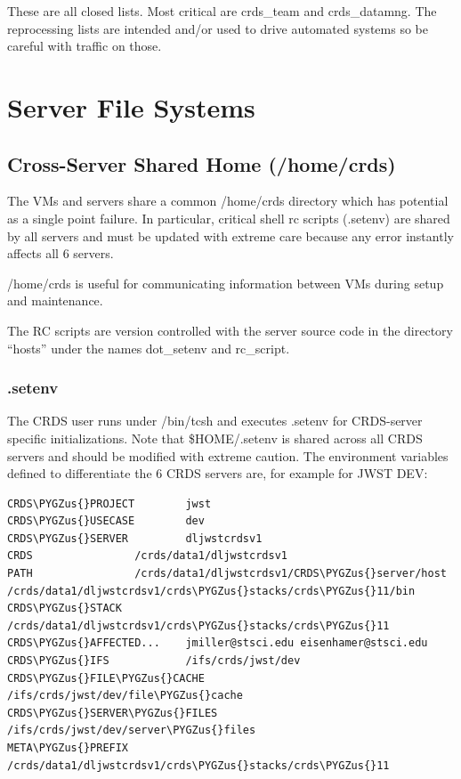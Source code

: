 \documentclass[letterpaper,10pt,english]{sphinxmanual}
\def\PYGZus{\char`\_}
\begin{document}
These are all closed lists.  Most critical are crds\_team and crds\_datamng.   The reprocessing lists are intended and/or used to drive
automated systems so be careful with traffic on those.


\chapter{Server File Systems}
\label{server_guide:server-file-systems}

\section{Cross-Server Shared Home (/home/crds)}
\label{server_guide:cross-server-shared-home-home-crds}
The VMs and servers share a common /home/crds directory which has potential as a single point failure.  In particular,
critical shell rc scripts (.setenv) are shared by all servers and must be updated with extreme care because
any error instantly affects all 6 servers.

/home/crds is useful for communicating information between VMs during setup and maintenance.

The RC scripts are version controlled with the server source code in the directory ``hosts'' under the names dot\_setenv
and rc\_script.


\subsection{.setenv}
\label{server_guide:setenv}
The CRDS user runs under /bin/tcsh and executes .setenv for CRDS-server specific initializations.   Note that
\$HOME/.setenv is shared across all CRDS servers and should be modified with extreme caution.   The environment
variables defined to differentiate the 6 CRDS servers are,  for example for JWST DEV:

\begin{Verbatim}[commandchars=\\\{\}]
CRDS\PYGZus{}PROJECT        jwst
CRDS\PYGZus{}USECASE        dev
CRDS\PYGZus{}SERVER         dljwstcrdsv1
CRDS                /crds/data1/dljwstcrdsv1
PATH                /crds/data1/dljwstcrdsv1/CRDS\PYGZus{}server/host   /crds/data1/dljwstcrdsv1/crds\PYGZus{}stacks/crds\PYGZus{}11/bin
CRDS\PYGZus{}STACK          /crds/data1/dljwstcrdsv1/crds\PYGZus{}stacks/crds\PYGZus{}11
CRDS\PYGZus{}AFFECTED...    jmiller@stsci.edu eisenhamer@stsci.edu
CRDS\PYGZus{}IFS            /ifs/crds/jwst/dev
CRDS\PYGZus{}FILE\PYGZus{}CACHE     /ifs/crds/jwst/dev/file\PYGZus{}cache
CRDS\PYGZus{}SERVER\PYGZus{}FILES   /ifs/crds/jwst/dev/server\PYGZus{}files
META\PYGZus{}PREFIX         /crds/data1/dljwstcrdsv1/crds\PYGZus{}stacks/crds\PYGZus{}11
\end{Verbatim}
\end{document}
